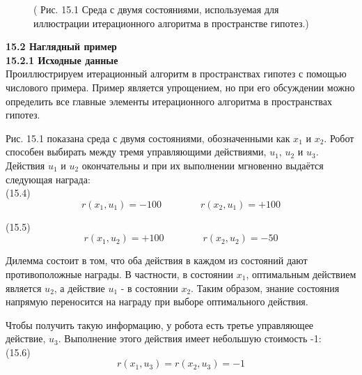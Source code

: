 \documentclass[10pt,a4paper]{article}
\begin{document}
\begin{figure}[H]
	\caption{ ( Рис. 15.1 Среда с двумя состояниями, используемая для иллюстрации итерационного алгоритма в пространстве гипотез.) }
	\label{fig:151orig}
\end{figure}

\textbf{15.2	Наглядный пример}\\

\textbf{15.2.1	Исходные данные}\\

Проиллюстрируем итерационный алгоритм в пространствах гипотез с помощью числового примера. Пример является упрощением, но при его обсуждении можно определить все главные элементы итерационного алгоритма в пространствах гипотез.

Рис. 15.1 показана среда с двумя состояниями, обозначенными как $x_1$ и $x_2$. Робот способен выбирать между тремя управляющими действиями, $u_1$, $u_2$ и $u_3$. Действия $u_1$ и $u_2$ окончательны и при их выполнении мгновенно выдаётся следующая награда:\\

(15.4)
$$r(x_1,u_1)=-100\qquad\qquad r(x_2,u_1)=+100$$

(15.5)
$$r(x_1,u_2)=+100\qquad\qquad r(x_2,u_2)=-50$$

Дилемма состоит в том, что оба действия в каждом из состояний дают противоположные награды. В частности, в состоянии $x_1$, оптимальным действием является $u_2$, а действие $u_1$ - в состоянии $x_2$. Таким образом, знание состояния напрямую переносится на награду при выборе оптимального действия.

Чтобы получить такую информацию, у робота есть третье управляющее действие, $u_3$. Выполнение этого действия имеет небольшую стоимость -1:\\

(15.6)
$$r(x_1,u_3)=r(x_2,u_3)=-1$$
\end{document}
